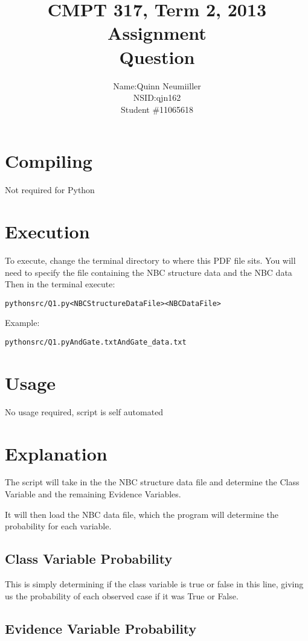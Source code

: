 \documentclass{article}
\title{CMPT 317, Term 2, 2013\\
Assignment \AssignmentNum\\
Question \QuestionNum\\
\AssignmentTitle
}
\author{
    \begin{tabular}{ l r }
      Name: & Quinn Neumiiller \\
      NSID: & qjn162 \\
      Student \# & 11065618 \\
    \end{tabular}
}
\date{\AssignmentDate}
\newcommand{\QuestionNum}{1}
\begin{document}
   \maketitle
   
   \section{Compiling}
   Not required for Python

   \section{Execution}
   To execute, change the terminal directory to where this PDF file sits.
   You will need to specify the file containing the NBC structure data and the NBC data
   Then in the terminal execute:
    \begin{alltt}
    python src/Q\QuestionNum.py <NBC Structure Data File> <NBC Data File>
    \end{alltt}
   Example:
    \begin{alltt}
    python src/Q\QuestionNum.py AndGate.txt AndGate_data.txt
    \end{alltt}

  \section{Usage}
    No usage required, script is self automated
  \section{Explanation}
    The script will take in the the NBC structure data file and determine the Class Variable and the remaining Evidence Variables.

    It will then load the NBC data file, which the program will determine the probability for each variable.

    \subsection{Class Variable Probability}

    This is simply determining if the class variable is true or false in this line, giving us the probability of each observed
    case if it was True or False.

    \subsection{Evidence Variable Probability}
\end{document}
